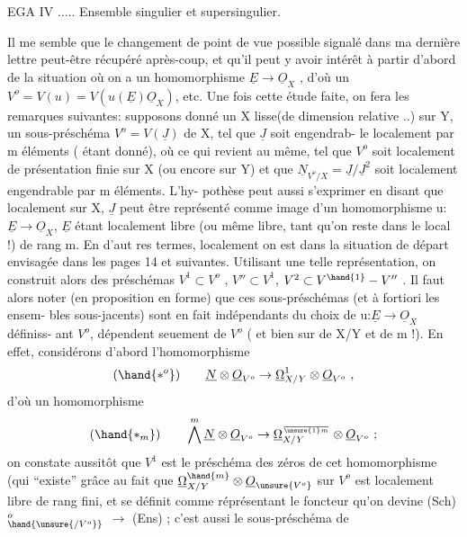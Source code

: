 
EGA IV ..... Ensemble singulier et supersingulier.

Il me semble que le changement de point de vue possible signalé dans ma
dernière lettre peut-être récupéré après-coup, et qu'il peut y avoir intérêt
à partir d'abord de la situation où on a  un homomorphisme $\underline{E}\to\underline{O}_X$ , d'où
un $V^o = V(u) = V(u(\underline{E})\underline{O}_X)$, etc. Une fois cette étude faite, on fera les
remarques suivantes: supposons donné un X lisse(de dimension relative  ..)
sur Y, un sous-préschéma $V^o = V(\underline{J})$ de X, tel que $\underline{J}$  soit engendrab-%
le localement  par m éléments ( étant donné), où ce qui revient au
même, tel que $V^o$ soit localement de présentation finie sur X (ou encore sur
Y) et que  $\underline{N}_{V^o/X} = \underline{J}/\underline{J}^2$  soit localement engendrable par m éléments.  L'hy-%
pothèse peut aussi s'exprimer en disant que localement sur X, $\underline{J}$ peut être
représenté comme image d'un homomorphisme  u: $\underline{E}\to\underline{O}_X$, $\underline{E}$ étant localement
libre (ou même libre, tant qu'on reste dans le local !) de rang m.  En d'aut
res termes, localement on est dans la situation de départ envisagée dans
les pages 14 et suivantes. Utilisant une telle représentation, on construit
alors des préschémas  $V^1 \subset V^o$ , $V'' \subset V^1$, $V^2 \subset V^{\hand{1}}-V''$ . Il faut alors noter
(en proposition en forme) que ces sous-préschémas (et à fortiori les ensem-%
bles sous-jacents) sont en fait indépendants du choix de u:$\underline{E}\to\underline{O}_X$ définiss-%
ant $V^o$,   dépendent seuement de  $V^o$ ( et bien sur de X/Y et de
m !).  En effet, considérons d'abord  l'homomorphisme
\[ (\hand{*^o}) \qquad \underline{N}\otimes\underline{O}_{V^o}\to\underline{\Omega}^1_{X/Y}\otimes\underline{O}_{V^o} \ , \]
d'où  un homomorphisme
\[ (\hand{*_m}) \qquad \bigwedge^m\underline{N}\otimes\underline{O}_{V^o}\to\underline{\Omega}^{\over{\unsure{1}}{m}}_{X/Y}\otimes\underline{O}_{V^o}\ ; \]
on constate aussitôt que $V^1$ est le préschéma des zéros de cet homomorphisme
(qui ``existe'' grâce au fait que $\underline{\Omega}^{\hand{m}}_{X/Y}\otimes\underline{O}_{\unsure{V^o}}$  sur  $V^o$ est localement libre
de rang fini, et se définit comme réprésentant le foncteur qu'on devine
(Sch)$^o_{\hand{\unsure{/V^o}}}$ $\longrightarrow$ (Ens) ; c'est aussi le sous-préschéma de 

